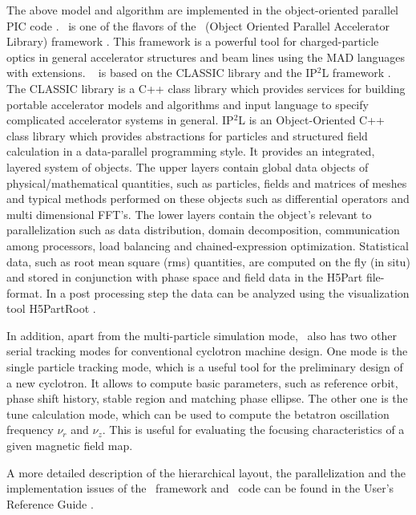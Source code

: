 \documentclass[aps,prstab,twocolumn,superscriptaddress,showpacs]{revtex4}
\begin{document}

The above model and algorithm are implemented in the object-oriented parallel PIC code \opalcycl. 
\opalcycl \  is one of the flavors of the \opal \ (Object Oriented Parallel Accelerator Library) framework \cite{opal:1}. 
This framework is a powerful tool for charged-particle optics in general accelerator structures and beam lines using the MAD languages with extensions.
\opal ~ is  based on the CLASSIC \cite{Classic:1} library and the IP$^2$L framework \cite{ippl:1}. The CLASSIC library is a C++ class library which provides services for building portable accelerator models and algorithms and input 
language to specify complicated accelerator systems in general. IP$^2$L is an Object-Oriented C++ class library which provides abstractions for particles and structured field calculation
in a data-parallel programming style. It provides an integrated, layered system of objects. The upper layers
contain global data objects of physical/mathematical quantities, such as particles, fields and matrices of meshes and typical methods
performed on these objects such as differential operators and multi dimensional FFT's. The lower layers contain the object's relevant to parallelization such as data distribution, domain decomposition, communication among processors, load balancing and chained-expression optimization. Statistical data, such as root mean square (rms) quantities, are computed on the fly (in situ) and stored in conjunction with phase space and
field data in the H5Part \cite{H5part:1} file-format. In a post processing step the data  can be analyzed
using the visualization tool H5PartRoot \cite{h5partroot:1}.

In addition, apart from the multi-particle simulation mode, \opalcycl \  also has two other serial tracking modes for conventional cyclotron machine design. 
One mode is the single particle tracking mode, which is a useful tool for 
the preliminary design of a new cyclotron. It allows to compute  basic parameters, such as reference orbit, phase shift history,
stable region and matching phase ellipse. The other one is the tune calculation mode, which can be used to compute the betatron oscillation frequency 
$\nu_r$ and $\nu_z$. This is useful for evaluating 
the focusing characteristics of a given magnetic field map. 

A more detailed description of the hierarchical layout, the parallelization and the implementation issues of the \opal \  framework and \opalcycl \  code
can be found in the User's Reference Guide \cite{opal:1}.  
\end{document}
